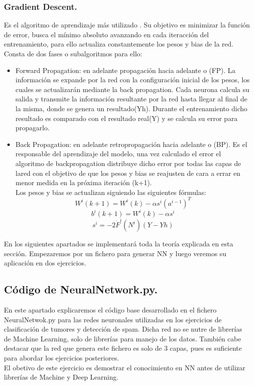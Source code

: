 \documentclass[a4paper,10pt]{article}
\begin{document}
\subsubsection{Gradient Descent.}
Es el algoritmo de aprendizaje más utilizado . Su objetivo es minimizar la función de error, busca el mínimo absoluto avanzando en cada iteracción del entrenamiento, para ello actualiza constantemente los pesos y bias de la red. Consta de dos fases o subalgoritmos para ello: 
\begin{itemize}
    \item Forward Propagation: en adelante propagación hacia adelante o (FP). La información se expande por la red con la configuración inicial de los pesos, los cuales se actualizarán mediante la back propagation. Cada neurona calcula su salida y transmite la información resultante por la red hasta llegar al final de la misma, donde se genera un resultado(Yh). Durante el entrenamiento dicho resultado es comparado con el resultado real(Y) y se calcula su error para propagarlo.
    \item Back Propagation: en adelante retropropagación hacia adelante o (BP). Es el responsable del aprendizaje del modelo, una vez calculado el error el algoritmo de backpropagation distribuye dicho error por todas las capas de lared con el objetivo de que los pesos y bias se reajusten de cara a errar en menor medida en la próxima iteración (k+1). \\Los pesos y bias se actualizan siguiendo las siguientes fórmulas:
    \[
    W^i (k+1) = W^i (k) - \alpha s^i (a^{i-1})^T
    \]
    \[
    b^i (k+1) = W^i (k) - \alpha s^i
    \]
    \[
    s^i = -2\dot{F}^i(N^i)(Y-Yh)
    \]
    
\end{itemize}

En los siguientes apartados se implementará toda la teoría explicada en esta sección. Empezaremos por un fichero para generar NN y luego veremos su aplicación en dos ejercicios.
\subsection{Código de NeuralNetwork.py.}
En este apartado explicaremos el código base desarrollado en el fichero NeuralNetwok.py para las redes neuronales utilizadas en los ejercicios de clasificación de tumores y detección de spam. Dicha red no se nutre de librerías de Machine Learning, solo de librerías para manejo de los datos. También cabe destacar que la red que genera este fichero es solo de 3 capas, pues es suficiente para abordar los ejercicios posteriores.\\ El obetivo de este ejercicio es demostrar el conocimiento en NN antes de utilizar librerías de Machine y Deep Learning.
\end{document}
